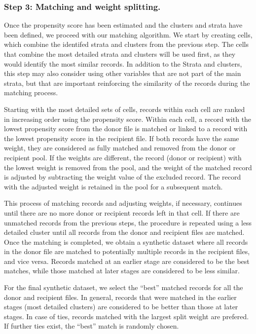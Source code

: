 \documentclass[
  11pt,
]{article}
\begin{document}
\subsubsection{Step 3: Matching and weight
splitting.}\label{step-3-matching-and-weight-splitting.}

Once the propensity score has been estimated and the clusters and strata
have been defined, we proceed with our matching algorithm. We start by
creating cells, which combine the identifed strata and clusters from the
previous step. The cells that combine the most detailed strata and
clusters will be used first, as they would identify the most similar
records. In addition to the Strata and clusters, this step may also
consider using other variables that are not part of the main strata, but
that are important reinforcing the similarity of the records during the
matching process.

Starting with the most detailed sets of cells, records within each cell
are ranked in increasing order using the propensity score. Within each
cell, a record with the lowest propensity score from the donor file is
matched or linked to a record with the lowest propensity score in the
recipient file. If both records have the same weight, they are
considered as fully matched and removed from the donor or recipient
pool. If the weights are different, the record (donor or recipient) with
the lowest weight is removed from the pool, and the weight of the
matched record is adjusted by subtracting the weight value of the
excluded record. The record with the adjusted weight is retained in the
pool for a subsequent match.

This process of matching records and adjusting weights, if necessary,
continues until there are no more donor or recipient records left in
that cell. If there are unmatched records from the previous steps, the
procedure is repeated using a less detailed cluster until all records
from the donor and recipient files are matched. Once the matching is
completed, we obtain a synthetic dataset where all records in the donor
file are matched to potentially multiple records in the recipient files,
and vice versa. Records matched at an earlier stage are considered to be
the best matches, while those matched at later stages are considered to
be less similar.

For the final synthetic dataset, we select the ``best'' matched records
for all the donor and recipient files. In general, records that were
matched in the earlier stages (most detailed clusters) are considered to
be better than those at later stages. In case of ties, records matched
with the largest split weight are prefered. If further ties exist, the
``best'' match is randomly chosen.
\end{document}
